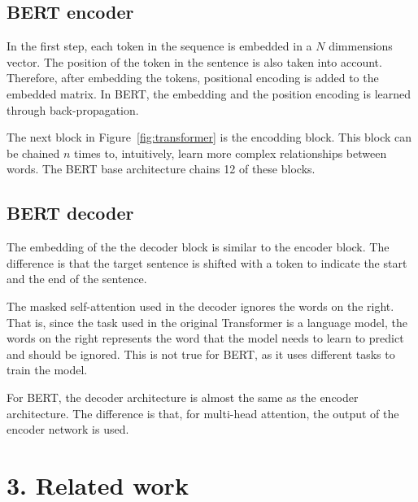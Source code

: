 \documentclass[letterpaper]{article}
\begin{document}
\subsection{BERT encoder}

In the first step, each token in the sequence is embedded in a $N$ dimmensions vector. The position of the token in the sentence is also taken into account. Therefore, after embedding the tokens, positional encoding is added to the embedded matrix. In BERT, the embedding and the position encoding is learned through back-propagation.

The next block in Figure~\ref{fig:transformer} is the encodding block. This block can be chained $n$ times to, intuitively, learn more complex relationships between words. The BERT base architecture chains 12 of these blocks.

\subsection{BERT decoder}

The embedding of the the decoder block is similar to the encoder block. The difference is that the target sentence is shifted with a token to indicate the start and the end of the sentence.

The masked self-attention used in the decoder ignores the words on the right. That is, since the task used in the original Transformer is a language model, the words on the right represents the word that the model needs to learn to predict and should be ignored. This is not true for BERT, as it uses different tasks to train the model.

For BERT, the decoder architecture is almost the same as the encoder architecture. The difference is that, for multi-head attention, the output of the encoder network is used.




\section{3. Related work}
\end{document}
